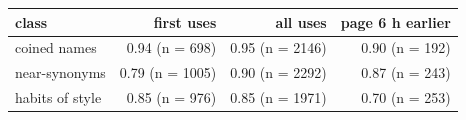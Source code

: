 \begin{tabular}{lrrr}
\toprule
class & first uses & all uses & page 6 h earlier \\
\midrule
coined names & 0.94 (n = 698) & 0.95 (n = 2146) & 0.90 (n = 192) \\
near-synonyms & 0.79 (n = 1005) & 0.90 (n = 2292) & 0.87 (n = 243) \\
habits of style & 0.85 (n = 976) & 0.85 (n = 1971) & 0.70 (n = 253) \\
\bottomrule
\end{tabular}

